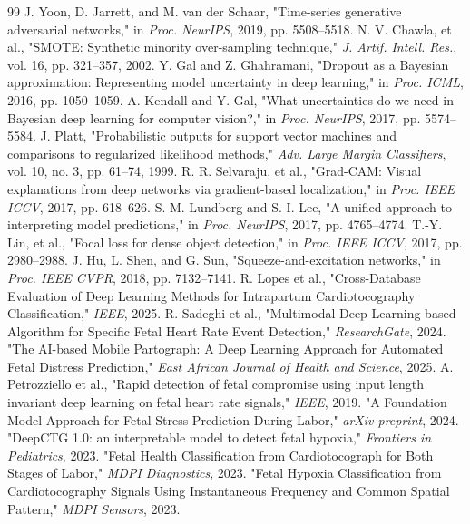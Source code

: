 \documentclass[12pt,a4paper]{report}
\begin{document}
\begin{thebibliography}{99}
 J. Yoon, D. Jarrett, and M. van der Schaar, "Time-series generative adversarial networks," in \textit{Proc. NeurIPS}, 2019, pp. 5508--5518.
 N. V. Chawla, et al., "SMOTE: Synthetic minority over-sampling technique," \textit{J. Artif. Intell. Res.}, vol. 16, pp. 321--357, 2002.
 Y. Gal and Z. Ghahramani, "Dropout as a Bayesian approximation: Representing model uncertainty in deep learning," in \textit{Proc. ICML}, 2016, pp. 1050--1059.
 A. Kendall and Y. Gal, "What uncertainties do we need in Bayesian deep learning for computer vision?," in \textit{Proc. NeurIPS}, 2017, pp. 5574--5584.
 J. Platt, "Probabilistic outputs for support vector machines and comparisons to regularized likelihood methods," \textit{Adv. Large Margin Classifiers}, vol. 10, no. 3, pp. 61--74, 1999.
 R. R. Selvaraju, et al., "Grad-CAM: Visual explanations from deep networks via gradient-based localization," in \textit{Proc. IEEE ICCV}, 2017, pp. 618--626.
 S. M. Lundberg and S.-I. Lee, "A unified approach to interpreting model predictions," in \textit{Proc. NeurIPS}, 2017, pp. 4765--4774.
 T.-Y. Lin, et al., "Focal loss for dense object detection," in \textit{Proc. IEEE ICCV}, 2017, pp. 2980--2988.
 J. Hu, L. Shen, and G. Sun, "Squeeze-and-excitation networks," in \textit{Proc. IEEE CVPR}, 2018, pp. 7132--7141.
 R. Lopes et al., "Cross-Database Evaluation of Deep Learning Methods for Intrapartum Cardiotocography Classification," \textit{IEEE}, 2025.
 R. Sadeghi et al., "Multimodal Deep Learning-based Algorithm for Specific Fetal Heart Rate Event Detection," \textit{ResearchGate}, 2024.
 "The AI-based Mobile Partograph: A Deep Learning Approach for Automated Fetal Distress Prediction," \textit{East African Journal of Health and Science}, 2025.
 A. Petrozziello et al., "Rapid detection of fetal compromise using input length invariant deep learning on fetal heart rate signals," \textit{IEEE}, 2019.
 "A Foundation Model Approach for Fetal Stress Prediction During Labor," \textit{arXiv preprint}, 2024.
 "DeepCTG 1.0: an interpretable model to detect fetal hypoxia," \textit{Frontiers in Pediatrics}, 2023.
 "Fetal Health Classification from Cardiotocograph for Both Stages of Labor," \textit{MDPI Diagnostics}, 2023.
 "Fetal Hypoxia Classification from Cardiotocography Signals Using Instantaneous Frequency and Common Spatial Pattern," \textit{MDPI Sensors}, 2023.
\end{thebibliography}
\end{document}
